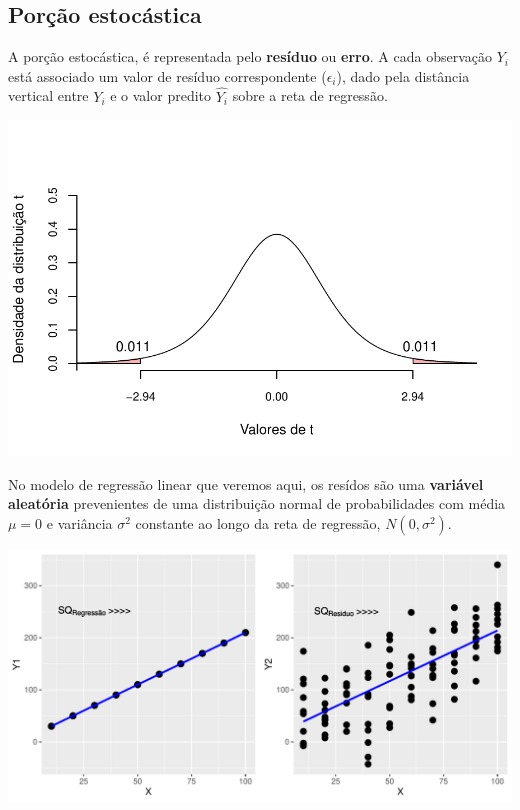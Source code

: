 \documentclass[
]{book}
\begin{document}
\hypertarget{poruxe7uxe3o-estocuxe1stica}{%
\subsection{Porção estocástica}\label{poruxe7uxe3o-estocuxe1stica}}

A porção estocástica, é representada pelo \textbf{resíduo} ou \textbf{erro}. A cada observação \(Y_i\) está associado um valor de resíduo correspondente (\(\epsilon_i\)), dado pela distância vertical entre \(Y_i\) e o valor predito \(\hat{Y_i}\) sobre a reta de regressão.

\begin{center}\includegraphics{probest-cambientais_files/figure-latex/unnamed-chunk-149-1} \end{center}

No modelo de regressão linear que veremos aqui, os resídos são uma \textbf{variável aleatória} prevenientes de uma distribuição normal de probabilidades com média \(\mu = 0\) e variância \(\sigma^2\) constante ao longo da reta de regressão, \(N(0, \sigma^2)\).

\begin{center}\includegraphics{probest-cambientais_files/figure-latex/unnamed-chunk-150-1} \end{center}
\end{document}

